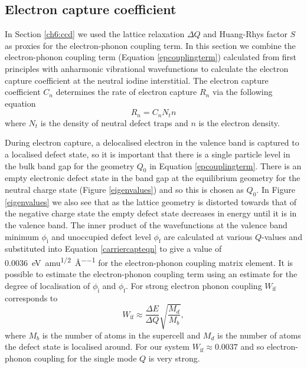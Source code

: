 \subsection{Electron capture coefficient} \label{finalsection}

In Section \ref{ch6:ccd} we used the lattice relaxation $\Delta Q$ and Huang-Rhys factor $S$ as proxies for the electron-phonon coupling term. In this section we combine the electron-phonon coupling term (Equation \ref{epcouplingterm}) calculated from first principles with anharmonic vibrational wavefunctions to calculate the electron capture coefficient at the neutral iodine interstitial. The electron capture coefficient $C_n$ determines the rate of electron capture $R_n$ via the following equation
\begin{equation} \label{rateeqn}
R_n=C_nN_tn
\end{equation}
where $N_t$ is the density of neutral defect traps and $n$ is the electron density.

During electron capture, a delocalised electron in the valence band is captured to a localised defect state, so it is important that there is a single particle level in the bulk band gap for the geometry $Q_0$ in Equation \ref{epcouplingterm}.\autocite{Alkauskas2014} There is an empty electronic defect state in the band gap at the equilibrium geometry for the neutral charge state (Figure \ref{eigenvalues}) and so this is chosen as $Q_0$.
In Figure \ref{eigenvalues} we also see that as the lattice geometry is distorted towards that of the negative charge state the empty defect state decreases in energy until it is in the valence band. 
The inner product of the wavefunctions at the valence band minimum $\phi_\textrm{i}$ and unoccupied defect level $\phi_\textrm{f}$ are calculated at various $Q$-values and substituted into Equation \ref{carriercapteqn} to give a value of \SI{0.0036}{\electronvolt\per amu\tothe{1/2}\per\angstrom} for the electron-phonon coupling matrix element.
It is possible to estimate the electron-phonon coupling term using an estimate for the degree of localisation of $\phi_\textrm{i}$ and $\phi_\textrm{f}$. For strong electron phonon coupling $W_\textrm{if}$ corresponds to 
\begin{equation}
W_\textrm{if} \approx \frac{\Delta E}{\Delta Q}\sqrt{\frac{M_d}{M_b}},
\end{equation}
where $M_b$ is the number of atoms in the supercell and $M_d$ is the number of atoms the defect state is localised around. For our system $W_\textrm{if}\approx0.0037$ and so electron-phonon coupling for the single mode $Q$ is very strong.

